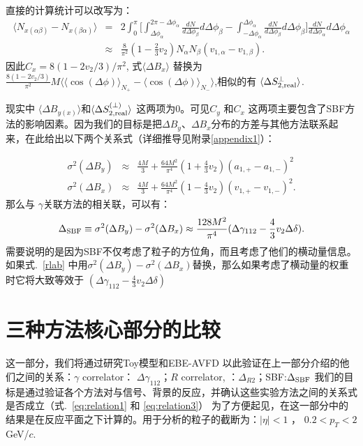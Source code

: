 直接的计算统计可以改写为：
\begin{eqnarray}
\langle N_{x(\alpha\beta)}-N_{x(\beta\alpha)} \rangle &=& 2\int_{0}^{\pi} 
\Big[\int_{\Delta\phi_\alpha}^{2\pi-\Delta\phi_\alpha} \frac{dN}{d\Delta\phi_\beta}d\Delta\phi_\beta-\int^{\Delta\phi_\alpha}_{-\Delta\phi_\alpha} \frac{dN}{d\Delta\phi_\beta}d\Delta\phi_\beta\Big]\frac{dN}{d\Delta\phi_\alpha}d\Delta\phi_\alpha \nonumber \\
&\approx& \frac{8}{\pi^2}(1-\frac{2}{3}v_2)N_\alpha N_\beta (v_{1,\alpha}-v_{1,\beta}).   
\end{eqnarray}
因此$C_x = 8(1-2v_2/3)/\pi^2$, 
式$\langle\Delta B_x\rangle$ 替换为 $\frac{8(1-2v_2/3)}{\pi^2} M \langle\langle \cos(\Delta \phi)\rangle_{N_+} -\langle \cos(\Delta\phi)\rangle_{N_-} \rangle$,相似的有 $\langle \Delta S_{2,\rm real}^{\perp}\rangle$. 

现实中 $\langle\Delta B_{y(x)}\rangle$和$\langle \Delta S_{2,\rm real}^{(\perp)}\rangle$ 这两项为0。可见$C_y$ 和$C_x$ 这两项主要包含了SBF方法的影响因素。因为我们的目标是把$\Delta B_y$、$\Delta B_x$分布的方差与其他方法联系起来，在此给出以下两个关系式（详细推导见附录\ref{appendix1}）：

\begin{eqnarray}
\sigma^2(\Delta B_y) &\approx& \frac{4M}{3}+ \frac{64M^2}{\pi^4}(1+ \frac{4}{3} v_2)(a_{1,+}-a_{1,-})^2 
\\
\sigma^2(\Delta B_x) &\approx& \frac{4M}{3}+ \frac{64M^2}{\pi^4}(1-\frac{4}{3}v_2)(v_{1,+}-v_{1,-})^2 .
\end{eqnarray}
那么与 $\gamma$关联方法的相关联，可以有：
\begin{equation}
\Delta_{\rm SBF} \equiv \sigma^2(\Delta B_y) - \sigma^2(\Delta B_x) \approx  \frac{128M^2}{\pi^4}(\Delta\gamma_{112}-\frac{4}{3}v_2\Delta\delta).   \label{eq:relation3} 
\end{equation}
需要说明的是因为SBF不仅考虑了粒子的方位角，而且考虑了他们的横动量信息。如果式.~\ref{rlab} 中用$\sigma^2(\Delta B_y) - \sigma^2({\Delta B_x})$替换，那么如果考虑了横动量的权重时它将大致等效于 $(\Delta \gamma_{112}-\frac{4}{3}v_2\Delta\delta)$


\section{三种方法核心部分的比较}
\label{Sec:kernel}
这一部分，我们将通过研究Toy模型和EBE-AVFD 以此验证在上一部分介绍的他们之间的关系：$\gamma$ correlator： $\Delta \gamma_{112}$；$R$ correlator, ：$\Delta_{R2}$；SBF:$\Delta_{\rm SBF}$
我们的目标是通过验证各个方法对与信号、背景的反应，并确认这些实验方法之间的关系式是否成立（式.~\ref{eq:relation1} 和 \ref{eq:relation3}）
为了方便起见，在这一部分中的结果是在反应平面之下计算的。用于分析的粒子的截断为：$|\eta|<1$ ， $0.2 < p_T < 2$ GeV/$c$.


